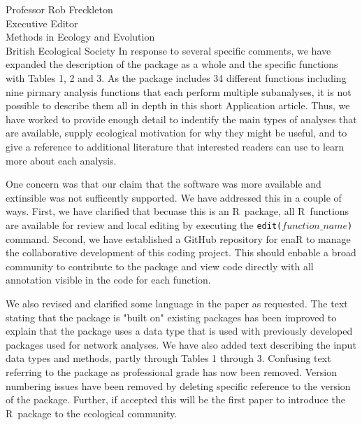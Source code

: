 \documentclass[letter]{letter}
\newcommand{\R}{R}
\begin{document}
\begin{letter}{Professor Rob Freckleton\\
Executive Editor\\
Methods in Ecology and Evolution\\
British Ecological Society
}
In response to several specific comments, we have expanded the
description of the package as a whole and the specific functions with
Tables 1, 2 and 3.  As the package includes 34 different functions
including nine pirmary analysis functions that each perform multiple
subanalyses, it is not possible to describe them all in depth in this
short Application article.  Thus, we have worked to provide enough
detail to indentify the main types of analyses that are available,
supply ecological motivation for why they might be useful, and to give
a reference to additional literature that interested readers can use
to learn more about each analysis.  

One concern was that our claim that the software was more available
and extinsible was not sufficently supported.  We have addressed this
in a couple of ways.  First, we have clarified that becuase this is an
\R\ package, all \R\ functions are available for review and local
editing by executing the \texttt{edit($function\_name$)} command.
Second, we have established a GitHub repository for enaR to manage the
collaborative development of this coding project.  This should enbable
a broad community to contribute to the package and view code directly
with all annotation visible in the code for each function. 

We also revised and clarified some language in the paper as requested.  The text
stating that the package is "built on" existing packages has been
improved to explain that the package uses a data type that is used
with previously developed packages used for network analyses. We have
also added text describing the input data types and methods, partly
through Tables 1 through 3. Confusing text referring to the package as
professional grade has now been removed. Version numbering issues have
been removed by deleting specific reference to the version of the
package.  Further, if accepted this will be the first paper to introduce the
\R\ package to the ecological community. 


\end{letter}
\end{document}
